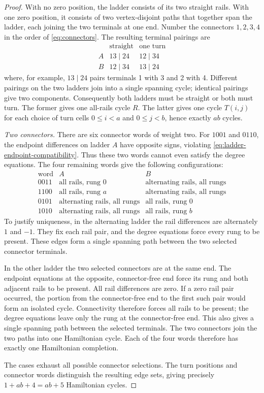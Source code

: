 \begin{proof}
With no zero position, the ladder consists of its two straight rails.
With one zero position, it consists of two vertex-disjoint paths that together
span the ladder, each joining the two terminals at one end.  Number the connectors
\(1,2,3,4\) in the order of \cref{eq:connectors}.  The resulting terminal
pairings are
\[
\begin{array}{c|cc}
 &\text{straight}&\text{one turn}\\ \hline
 A&13\mid24&12\mid34\\
 B&12\mid34&13\mid24
\end{array}
\]
where, for example, \(13\mid24\) pairs terminals 1 with 3 and 2 with 4.
Different pairings on the two ladders join into a single spanning cycle;
identical pairings give two components.  Consequently both ladders must be
straight or both must turn.  The former gives one all-rails cycle \(R\).
The latter gives one cycle \(T(i,j)\) for each choice of turn cells
\(0\le i<a\) and \(0\le j<b\), hence exactly \(ab\) cycles.

\smallskip\noindent\emph{Two connectors.}
There are six connector words of weight two.  For \(1001\) and \(0110\),
the endpoint differences on ladder \(A\) have opposite signs, violating
\cref{eq:ladder-endpoint-compatibility}.  Thus these two words cannot even
satisfy the degree equations.  The four remaining words give the following
configurations:
\[
\begin{array}{c|cc}
\text{word}& A&B\\ \hline
0011&\text{all rails, rung }0&\text{alternating rails, all rungs}\\
1100&\text{all rails, rung }a&\text{alternating rails, all rungs}\\
0101&\text{alternating rails, all rungs}&\text{all rails, rung }0\\
1010&\text{alternating rails, all rungs}&\text{all rails, rung }b
\end{array}
\]
To justify uniqueness, in the alternating ladder the rail differences are
alternately \(1\) and \(-1\).  They fix each rail pair, and the degree
equations force every rung to be present.  These edges form a single spanning
path between the two selected connector terminals.

In the other ladder the two selected connectors are at the same end.  The
endpoint equations at the opposite, connector-free end force its rung and
both adjacent rails to be present.  All rail differences are zero.  If a
zero rail pair occurred, the portion from the connector-free end to the
first such pair would form an isolated cycle.  Connectivity therefore
forces all rails to be present; the degree equations leave only the rung
at the connector-free end.  This also gives a single spanning path between
the selected terminals.  The two connectors join the two paths into one
Hamiltonian cycle.  Each of the four words therefore has exactly one
Hamiltonian completion.

The cases exhaust all possible connector selections.  The turn positions
and connector words distinguish the resulting edge sets, giving precisely
\(1+ab+4=ab+5\) Hamiltonian cycles.
\end{proof}
